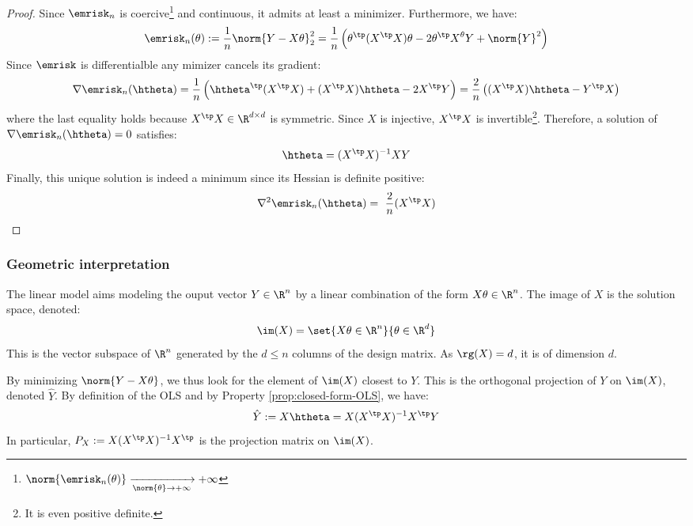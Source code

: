 \documentclass{../cs-classes/cs-classes}
\begin{document}
\begin{proof}
    Since $\emrisk_n$ is coercive\footnote{$\norm{\emrisk_n(\theta)} \xrightarrow[\norm{\theta}\to+\infty]{} +\infty$} and continuous, it admits at least a minimizer. Furthermore, we have:
    \begin{equation*}
        \emrisk_n(\theta) := \frac{1}{n}\norm{Y-X\theta}^2_2 = \frac{1}{n}\left(\theta^\tp(X^\tp X)\theta - 2\theta^\tp X^\theta Y+\norm{Y}^2\right)
    \end{equation*}
    Since $\emrisk$ is differentialble any mimizer cancels its gradient:
    \begin{equation*}
        \nabla\emrisk_n(\htheta) = \frac{1}{n}\left(\htheta^\tp(X^\tp X) + (X^\tp X)\htheta - 2X^\tp Y\right) = \frac{2}{n}\left((X^\tp X)\htheta - Y^\tp X\right)
    \end{equation*}
    where the last equality holds because $X^\tp X\in\R^{d\times d}$ is symmetric. Since $X$ is injective, $X^\tp X$ is invertible\footnote{It is even positive definite.}. Therefore, a solution of $\nabla\emrisk_n(\htheta)=0$ satisfies:
    \begin{equation*}
        \htheta = (X^\tp X)^{-1}XY
    \end{equation*}
    Finally, this unique solution is indeed a minimum since its Hessian is definite positive:
    \begin{equation*}
        \nabla^2\emrisk_n(\htheta) = \frac{2}{n}(X^\tp X)
    \end{equation*}
\end{proof}

\subsubsection{Geometric interpretation}
The linear model aims modeling the ouput vector $Y\in\R^n$ by a linear combination of the form $X\theta\in\R^n$. The image of $X$ is the solution space, denoted:
\begin{equation*}
    \im(X)=\set{X\theta\in\R^n}{\theta\in\R^d}
\end{equation*}
This is the vector subspace of $\R^n$ generated by the $d\leq n$ columns of the design matrix. As $\rg(X)=d$, it is of dimension $d$.

By minimizing $\norm{Y-X\theta}$, we thus look for the element of $\im(X)$ closest to $Y$. This is the orthogonal projection of $Y$ on $\im(X)$, denoted $\hat{Y}$. By definition of the OLS and by Property \ref{prop:closed-form-OLS}, we have:
\begin{equation*}
    \hat{Y} := X\htheta = X(X^\tp X)^{-1}X^\tp Y
\end{equation*}
In particular, $P_X:=X(X^\tp X)^{-1}X^\tp$ is the projection matrix on $\im(X)$.
\end{document}

